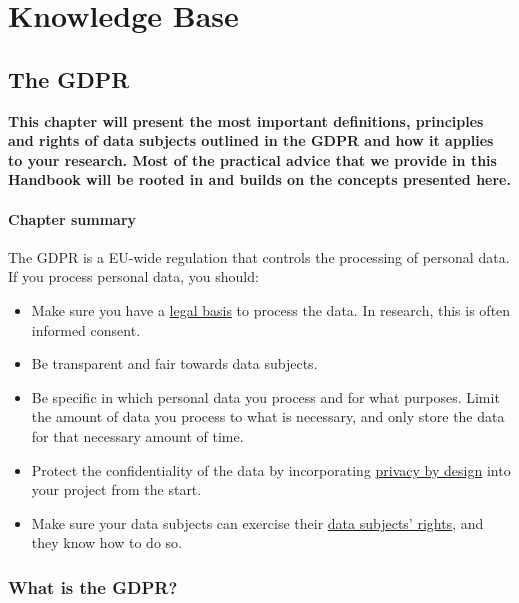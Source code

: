\documentclass[
]{book}
\providecommand{\tightlist}{%
  \setlength{\itemsep}{0pt}\setlength{\parskip}{0pt}}
\begin{document}
\hypertarget{part-knowledge-base}{%
\part*{Knowledge Base}\label{part-knowledge-base}}

\hypertarget{gdpr}{%
\chapter*{The GDPR}\label{gdpr}}

\textbf{This chapter will present the most important definitions, principles and rights
of data subjects outlined in the GDPR and how it applies to your research. Most
of the practical advice that we provide in this Handbook will be rooted in and
builds on the concepts presented here.}

\hypertarget{chapter-summary}{%
\subsection{Chapter summary}\label{chapter-summary}}

The GDPR is a EU-wide regulation that controls the processing of personal data.
If you process personal data, you should:

\begin{itemize}
\tightlist
\item
  Make sure you have a \protect\hyperlink{legal-basis}{legal basis} to process the
  data. In research, this is often informed consent.
\item
  Be transparent and fair towards data subjects.
\item
  Be specific in which personal data you process and for what purposes. Limit
  the amount of data you process to what is necessary, and only store the data
  for that necessary amount of time.
\item
  Protect the confidentiality of the data by incorporating
  \protect\hyperlink{privacy-by-design}{privacy by design} into your project from the start.
\item
  Make sure your data subjects can exercise their
  \protect\hyperlink{data-subject-rights}{data subjects' rights}, and they know how to do so.
\end{itemize}

\hypertarget{what-is-the-gdpr}{%
\section{What is the GDPR?}\label{what-is-the-gdpr}}
\end{document}
